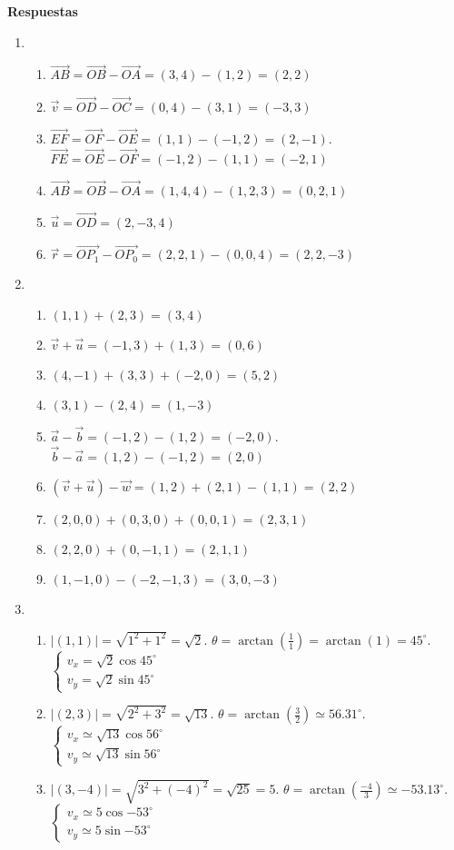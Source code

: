 \documentclass[a4paper]{article}
\newcommand{\exercise}{\item}
\newcommand{\SEL}[1]{ \left\{\begin{matrix} #1 \end{matrix}\right. }
\newcommand{\df}[2]{\displaystyle\frac{#1}{#2}}
\newcommand{\vect}[1]{\overrightarrow{#1}}
\newcommand{\degs}{^{\circ}}
\begin{document}
 \textbf{Respuestas}\begin{enumerate}\exercise\begin{enumerate} [label=(\alph*)]		\item $\vect{AB}= \vect{OB} - \vect{OA} = (3,4) - (1,2) = (2,2)$
		\item $\vec{v}= \vect{OD} - \vect{OC} = (0,4) - (3,1)= (-3,3)$
		\item $\vect{EF} = \vect{OF} - \vect{OE} = (1,1) - (-1,2) = (2,-1)$. $\vect{FE} = \vect{OE} - \vect{OF} = (-1,2) - (1,1) = (-2,1)$
		\item $\vect{AB} = \vect{OB} - \vect{OA} = (1,4,4) - (1,2,3) = (0,2,1)$
		\item $\vec{u} = \vect{OD} = (2,-3,4)$
		\item $\vec{r} = \vect{OP_1} - \vect{OP_0} = (2,2,1) - (0,0,4) = (2,2,-3)$
\end{enumerate}\exercise\begin{enumerate} [label=(\alph*)]		\item $(1,1)+(2,3) = (3,4)$
		\item $\vec{v} + \vec{u} = (-1,3) + (1,3) = (0,6)$
		\item $(4,-1)+(3,3)+(-2,0) = (5,2)$
		\item $(3,1)-(2,4) = (1,-3)$
		\item $\vec{a} - \vec{b} = (-1,2) - (1,2) = (-2,0)$. $\vec{b} - \vec{a} = (1,2) - (-1,2) = (2,0)$
		\item $\left(\vec{v}+\vec{u}\right)-\vec{w} = (1,2)+(2,1)-(1,1) = (2,2)$
		\item $(2,0,0)+(0,3,0)+(0,0,1) = (2,3,1)$
		\item $(2,2,0)+(0,-1,1) = (2,1,1)$
		\item $(1,-1,0)-(-2,-1,3) = (3,0,-3)$
\end{enumerate}\exercise\begin{enumerate} [label=(\alph*)]		\item $|(1,1)| = \sqrt{1^2+1^2} = \sqrt{2}$. $\theta=\arctan\left(\df{1}{1}\right) = \arctan(1) = 45\degs$. $\SEL{v_x=\sqrt{2} \cos{45\degs} \\ v_y=\sqrt{2} \sin{45\degs} }$
		\item $|(2,3)| = \sqrt{2^2+3^2} = \sqrt{13}$. $\theta=\arctan\left(\df{3}{2}\right) \simeq 56.31\degs$.  $\SEL{v_x \simeq\sqrt{13} \cos{56\degs} \\ v_y\simeq\sqrt{13} \sin{56\degs} }$
		\item $|(3,-4)| = \sqrt{3^2+(-4)^2} = \sqrt{25} = 5$. $\theta=\arctan\left(\df{-4}{3}\right) \simeq -53.13\degs$. $\SEL{v_x \simeq 5 \cos{-53\degs} \\ v_y\simeq5 \sin{-53\degs} }$

\end{enumerate}
\end{enumerate}
\end{document}
